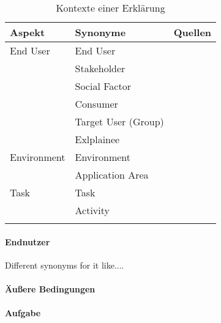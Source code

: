 \begin{longtable}{|p{}|p{}|p{}|}
    \hline
    \textbf{Aspekt} & \textbf{Synonyme} & \textbf{Quellen} \\ \hline
    End User        & End User & \cite{chazette2020explainability} \cite{kaptein_personalised_2017} \cite{sokol_one_2020} \\
                    & Stakeholder & \cite{chazette_knowledge_nodate} \\
                    & Social Factor & \cite{ehsan_human-centered_2020} \\
                    & Consumer & \cite{ehsan_human-centered_2020} \\
                    & Target User (Group) & \cite{chazette2020explainability} \cite{wiegand_id_2020} \\
                    & Exlplainee & \cite{chazette_knowledge_nodate} \\
    \hline
    Environment     & Environment & \cite{chazette_knowledge_nodate} \cite{wiegand_id_2020} \cite{wiegand2019drive} \\
                    & Application Area & \cite{sokol_explainability_2020} \cite{wiegand2019drive} \cite{wiegand_id_2020} \\
    \hline
    Task            & Task & \cite{chazette_knowledge_nodate} \cite{sokol_explainability_2020} \cite{gunning2019darpa} \\
                    & Activity & \cite{wohlin2012experimentation} \\
                    
    \hline
\caption{Kontexte einer Erklärung}
\label{tab:impact_of_context_on_explanation}
\end{longtable}

\paragraph{Endnutzer}

Different synonyms for it like....

\paragraph{Äußere Bedingungen}

\paragraph{Aufgabe}

